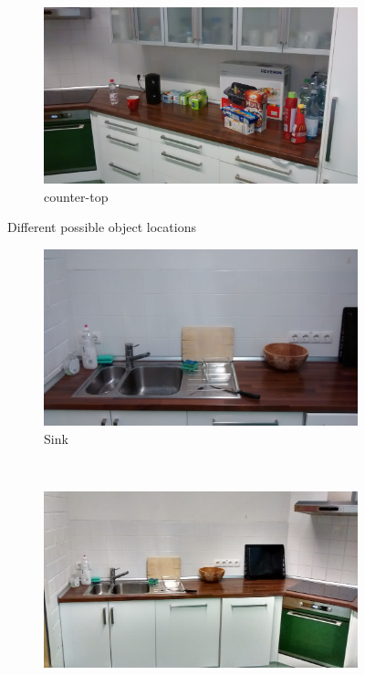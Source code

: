 \documentclass{article}
\begin{document}
{\begin{figure}
\begin{subfigure}[b]{0.3\textwidth}
        \includegraphics[width=\textwidth]{images/counter-top.jpg}
        \caption{counter-top}
        \label{fig:counter-top}
    \end{subfigure}
    \caption{Different possible object locations}\label{fig:alllocations}
\end{figure}
\begin{figure}
    \centering
    \begin{subfigure}[b]{0.3\textwidth}
        \includegraphics[width=\textwidth]{images/sink.jpg}
        \caption{Sink}
        \label{fig:sink}
    \end{subfigure}
    ~ %
    \begin{subfigure}[b]{0.3\textwidth}
        \includegraphics[width=\textwidth]{images/stove.jpg}

\end{subfigure}
\end{figure}}
\end{document}
